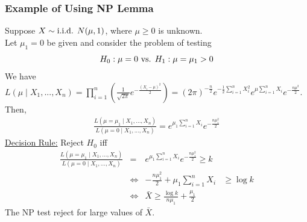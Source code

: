\documentclass[11pt]{elegantbook}
\begin{document}
\subsubsection*{Example of Using NP Lemma}
\begin{example}
    Suppose $X\sim \textnormal{i.i.d. } N(\mu,1)$, where $\mu\geq 0$ is unknown.\\
    Let $\mu_1=0$ be given and consider the problem of testing $$H_0:\mu=0 \textnormal{ vs. }H_1:\mu=\mu_1>0$$
    We have $L(\mu\mid X_1,...,X_n)=\prod_{i=1}^n \left(\frac{1}{\sqrt{2\pi}}e^{-\frac{(X_i-\mu)^2}{2}}\right)=\left(2\pi\right)^{-\frac{n}{2}}e^{-\frac{1}{2}\sum_{i=1}^n X_i^2} e^{\mu\sum_{i=1}^n X_i}e^{-\frac{n\mu^2}{2}}$. Then,
    \begin{equation}
        \begin{aligned}
            \frac{L(\mu=\mu_1\mid X_1,...,X_n)}{L(\mu=0\mid X_1,...,X_n)}=e^{\mu_1\sum_{i=1}^n X_i}e^{-\frac{n\mu_1^2}{2}}
        \end{aligned}
        \nonumber
    \end{equation}
    \underline{Decision Rule:}
    Reject $H_0$ iff
    \begin{equation}
        \begin{aligned}
            \frac{L(\mu=\mu_1\mid X_1,...,X_n)}{L(\mu=0\mid X_1,...,X_n)}&=&e^{\mu_1\sum_{i=1}^n X_i}e^{-\frac{n\mu_1^2}{2}}\geq k\\
            &\Leftrightarrow& -\frac{n\mu_1^2}{2}+\mu_1\sum_{i=1}^n X_i&\geq \log k\\
            &\Leftrightarrow& \bar{X}\geq \frac{\log k }{n\mu_1}+\frac{\mu_1}{2}
        \end{aligned}
        \nonumber
    \end{equation}
    The NP test reject for large values of $\bar{X}$.
\end{example}
\end{document}
